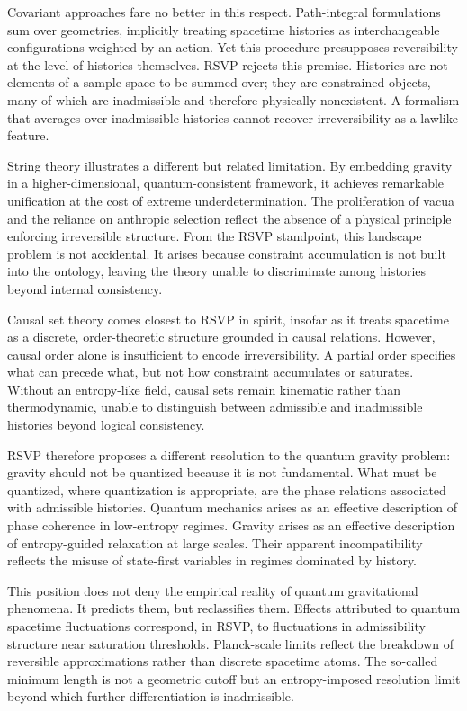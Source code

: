 \documentclass[11pt,oneside]{book}
\begin{document}
Covariant approaches fare no better in this respect. Path-integral formulations sum over geometries, implicitly treating spacetime histories as interchangeable configurations weighted by an action. Yet this procedure presupposes reversibility at the level of histories themselves. RSVP rejects this premise. Histories are not elements of a sample space to be summed over; they are constrained objects, many of which are inadmissible and therefore physically nonexistent. A formalism that averages over inadmissible histories cannot recover irreversibility as a lawlike feature.

String theory illustrates a different but related limitation. By embedding gravity in a higher-dimensional, quantum-consistent framework, it achieves remarkable unification at the cost of extreme underdetermination. The proliferation of vacua and the reliance on anthropic selection reflect the absence of a physical principle enforcing irreversible structure. From the RSVP standpoint, this landscape problem is not accidental. It arises because constraint accumulation is not built into the ontology, leaving the theory unable to discriminate among histories beyond internal consistency.

Causal set theory comes closest to RSVP in spirit, insofar as it treats spacetime as a discrete, order-theoretic structure grounded in causal relations. However, causal order alone is insufficient to encode irreversibility. A partial order specifies what can precede what, but not how constraint accumulates or saturates. Without an entropy-like field, causal sets remain kinematic rather than thermodynamic, unable to distinguish between admissible and inadmissible histories beyond logical consistency.

RSVP therefore proposes a different resolution to the quantum gravity problem: gravity should not be quantized because it is not fundamental. What must be quantized, where quantization is appropriate, are the phase relations associated with admissible histories. Quantum mechanics arises as an effective description of phase coherence in low-entropy regimes. Gravity arises as an effective description of entropy-guided relaxation at large scales. Their apparent incompatibility reflects the misuse of state-first variables in regimes dominated by history.

This position does not deny the empirical reality of quantum gravitational phenomena. It predicts them, but reclassifies them. Effects attributed to quantum spacetime fluctuations correspond, in RSVP, to fluctuations in admissibility structure near saturation thresholds. Planck-scale limits reflect the breakdown of reversible approximations rather than discrete spacetime atoms. The so-called minimum length is not a geometric cutoff but an entropy-imposed resolution limit beyond which further differentiation is inadmissible.
\end{document}
